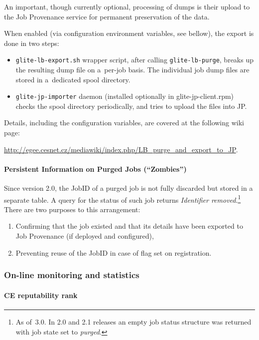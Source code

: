 An important, though currently optional, processing of \LB dumps
is their upload to the Job Provenance service for permanent preservation
of the data.


When enabled (via configuration environment variables, see bellow), 
the export is done in two steps:
\begin{itemize}
\item \verb'glite-lb-export.sh' wrapper script, after calling \verb'glite-lb-purge', breaks up the resulting dump file on a~per-job basis.
The individual job dump files are stored in a~dedicated spool directory.
\item \verb'glite-jp-importer' daemon (installed optionally in glite-jp-client.rpm) checks the spool directory periodically,
and tries to upload the files into JP.
\end{itemize}

Details, including the configuration variables, are covered at the following
wiki page:

\url{http://egee.cesnet.cz/mediawiki/index.php/LB_purge_and_export_to_JP}.

\paragraph{Persistent Information on Purged Jobs (``Zombies'')}

Since \LB version 2.0, the JobID of a purged job is not fully discarded but stored in a separate table. A query for the status of such job returns \emph{Identifier removed}.\footnote{As of \LB\,3.0. In 2.0 and 2.1 releases an empty job status structure was returned with job state set to \emph{purged}.} There are two purposes to this arrangement:

\begin{enumerate}
\item Confirming that the job existed and that its details have been exported to Job Provenance (if deployed and configured),
\item Preventing reuse of the JobID in case of flag  set on registration.
\end{enumerate}

\subsubsection{On-line monitoring and statistics}
\label{maintain:statistics}

\paragraph{CE reputability rank}

